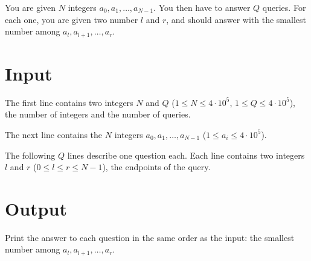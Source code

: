 
You are given $N$ integers $a_0, a_1, \dots, a_{N-1}$. You then have to answer $Q$ queries. For each one,
you are given two number $l$ and $r$, and should answer with the smallest number among $a_l,a_{l+1},\dots,a_{r}$.

\section*{Input}
The first line contains two integers $N$ and $Q$ ($1 \leq N \leq 4 \cdot 10^5$, $1 \leq Q \leq 4 \cdot 10^5$),
the number of integers and the number of queries.

The next line contains the $N$ integers $a_0, a_1, \dots, a_{N-1}$ ($1 \leq a_i \leq 4 \cdot 10^5$).

The following $Q$ lines describe one question each. Each line contains two integers $l$ and $r$ ($0 \leq l \leq r \leq N-1$),
the endpoints of the query.


\section*{Output}
Print the answer to each question in the same order as the input: the smallest number among $a_l, a_{l+1},\dots,a_{r}$.
